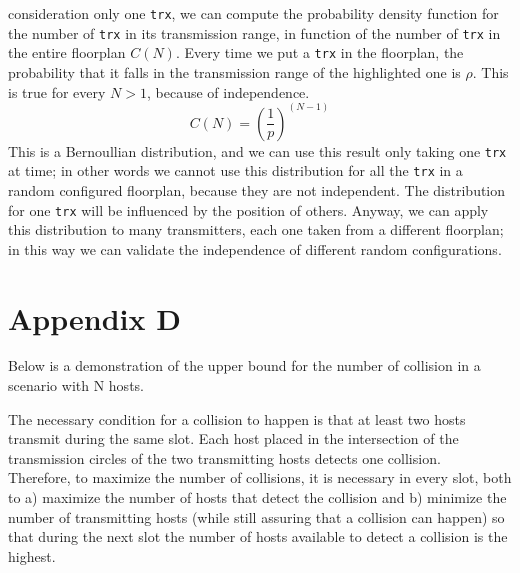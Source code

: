 consideration only one \texttt{trx}, we can compute the probability density
function for the number of \texttt{trx} in its transmission range, in function
of the number of \texttt{trx} in the entire floorplan $C(N)$. Every time we put
a \texttt{trx} in the floorplan, the probability that it falls in the
transmission range of the highlighted one is $\rho$. This is true for every
$N > 1$, because of independence.
\begin{equation*}
    C(N)= \left(\frac{1}{p}\right)^{\left( N-1 \right)}
\end{equation*}
This is a Bernoullian distribution, and we can use this result only taking one
\texttt{trx} at time; in other words we cannot use this distribution for all the
\texttt{trx} in a random configured floorplan, because they are not independent. 
The distribution for one \texttt{trx} will be influenced by the position of
others. Anyway, we can apply this distribution to many transmitters, each one
taken from a different floorplan; in this way we can validate the independence
of different random configurations.

\section*{Appendix D}
\label{app:d}
Below is a demonstration of the upper bound for the number of collision in a scenario with N hosts.

\hfill \break
The necessary condition for a collision to happen is that at least two hosts transmit during the same slot. Each host placed in the intersection of the transmission circles of the two transmitting hosts detects one collision. \\
Therefore, to maximize the number of collisions, it is necessary in every slot, both to a) maximize the number of hosts that detect the collision and b) minimize the number of transmitting hosts (while still assuring that a collision can happen) so that during the next slot the number of hosts available to detect a collision is the highest.

